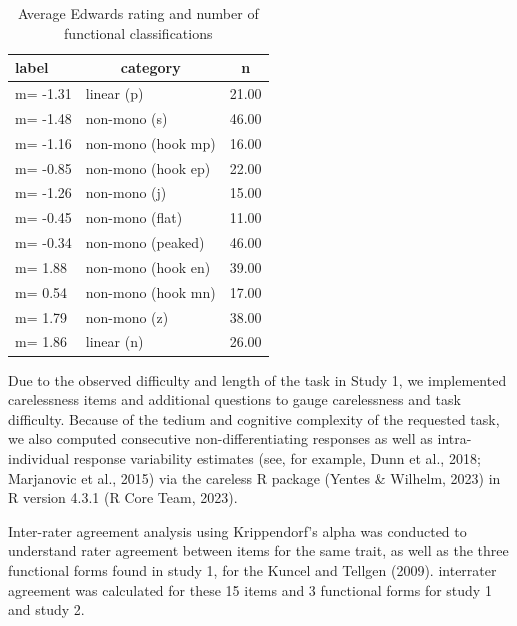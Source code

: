 \documentclass[
  ,jou]{apa6}
\begin{document}
\begin{table}[tbp]

\begin{center}
\begin{threeparttable}

\caption{\label{tab:qsorttable}Average Edwards rating and number of functional classifications}

\begin{tabular}{lll}
\toprule
label & \multicolumn{1}{c}{category} & \multicolumn{1}{c}{n}\\
\midrule
m= -1.31 & linear (p) & 21.00\\
m= -1.48 & non-mono (s) & 46.00\\
m= -1.16 & non-mono (hook mp) & 16.00\\
m= -0.85 & non-mono (hook ep) & 22.00\\
m= -1.26 & non-mono (j) & 15.00\\
m= -0.45 & non-mono (flat) & 11.00\\
m= -0.34 & non-mono (peaked) & 46.00\\
m= 1.88 & non-mono (hook en) & 39.00\\
m= 0.54 & non-mono (hook mn) & 17.00\\
m= 1.79 & non-mono (z) & 38.00\\
m= 1.86 & linear (n) & 26.00\\
\bottomrule
\end{tabular}

\end{threeparttable}
\end{center}

\end{table}

Due to the observed difficulty and length of the task in Study 1, we implemented carelessness items and additional questions to gauge carelessness and task difficulty. Because of the tedium and cognitive complexity of the requested task, we also computed consecutive non-differentiating responses as well as intra-individual response variability estimates (see, for example, Dunn et al., 2018; Marjanovic et al., 2015) via the careless R package (Yentes \& Wilhelm, 2023) in R version 4.3.1 (R Core Team, 2023).

Inter-rater agreement analysis using Krippendorf's alpha was conducted to understand rater agreement between items for the same trait, as well as the three functional forms found in study 1, for the Kuncel and Tellgen (2009). interrater agreement was calculated for these 15 items and 3 functional forms for study 1 and study 2.
\end{document}
